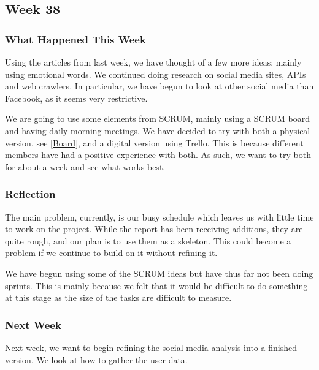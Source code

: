 \subsection{Week 38} 
\subsubsection{What Happened This Week} 
Using the articles from last week, we have thought of a few more ideas; mainly
using emotional words. We continued doing research on social media sites, APIs
and web crawlers. In particular, we have begun to look at other social media
than Facebook, as it seems very restrictive.\nl

We are going to use some elements from SCRUM, mainly using a SCRUM board and
having daily morning meetings. We have decided to try with both a physical
version, see \autoref{Board}, and a digital version using Trello. This is
because different members have had a positive experience with both. As such, we
want to try both for about a week and see what works best. 


\subsubsection{Reflection}
The main problem, currently, is our busy schedule which leaves us with little
time to work on the project. While the report has been receiving additions, they
are quite rough, and our plan is to use them as a skeleton. This could become a
problem if we continue to build on it without refining it.\nl

We have begun using some of the SCRUM ideas but have thus far not been doing
sprints. This is mainly because we felt that it would be difficult to do
something at this stage as the size of the tasks are difficult to measure.

\subsubsection{Next Week}
Next week, we want to begin refining the social media analysis into a finished
version. We look at how to gather the user data.






